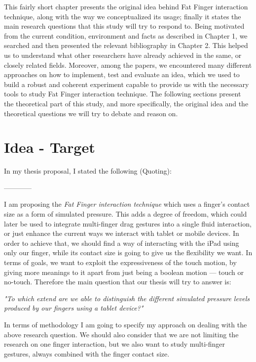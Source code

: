 
This fairly short chapter presents the original idea behind Fat Finger interaction technique, along with the way we conceptualized its usage; finally it states the main research questions that this study will try to respond to. Being motivated from the current condition, environment and facts as described in Chapter 1, we searched and then presented the relevant bibliography in Chapter 2. This helped us to understand what other researchers have already achieved in the same, or closely related fields. Moreover, among the papers, we encountered many different approaches on how to implement, test and evaluate an idea, which we used to build a robust and coherent experiment capable to provide us with the necessary tools to study Fat Finger interaction technique. The following sections present the theoretical part of this study, and more specifically, the original idea and the theoretical questions we will try to debate and reason on.

\section{Idea - Target}
In my thesis proposal, I stated the following (Quoting):

------------

I am proposing the \emph{Fat Finger interaction technique} which uses a finger's contact size as a form of simulated pressure. This adds a degree of freedom, which could later be used to integrate multi-finger drag gestures into a single fluid interaction, or just enhance the current ways we interact with tablet or mobile devices. In order to achieve that, we should find a way of interacting with the iPad using only our finger, while its contact size is going to give us the flexibility we want. In terms of goals, we want to exploit the expressiveness of the touch motion, by giving more meanings to it apart from just being a boolean motion --- touch or no-touch. Therefore the main question that our thesis will try to answer is:

\emph{"To which extend are we able to distinguish the different simulated pressure levels produced by our fingers using a tablet device?"}

In terms of methodology I am going to specify my approach on dealing with the above research question. We should also consider that we are not limiting the research on one finger interaction, but we also want to study multi-finger gestures, always combined with the finger contact size.


